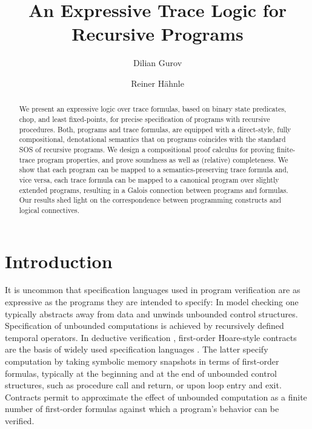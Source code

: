 \documentclass[a4paper,numberwithinsect]{lipics-v2021}
\title{An Expressive Trace Logic for Recursive Programs}
\author{Dilian Gurov}{KTH Royal Institute of Technology, Stockholm, Sweden}{dilian@kth.se}{0000-0002-0074-8786}{}
\author{Reiner H\"{a}hnle}{Technical University of Darmstadt, Germany}{haehnle@cs.tu-darmstadt.de}{0000-0001-8000-7613}{}
\begin{document}
\maketitle

\begin{abstract}
  We present an expressive logic over trace formulas, based on binary
  state predicates, chop, and least fixed-points, for precise specification 
  of programs with recursive procedures. Both, programs and trace
  formulas, are equipped with a direct-style, fully compositional,
  denotational semantics that on programs coincides with the standard
  SOS of recursive programs.
  We design a compositional proof calculus for proving finite-trace
  program properties, and prove soundness as well as (relative) completeness.
  We show that each program can be mapped to a semantics-preserving
  trace formula and, vice versa, each trace formula can be mapped to a
  canonical program over slightly extended programs, resulting in a
  Galois connection between programs and formulas.
  Our results shed light on the correspondence between programming
  constructs and logical connectives. 
\end{abstract}


\section{Introduction}
\label{sec:intro}

It is uncommon that specification languages used in program
verification are as expressive as the programs they are intended to
specify:
%
In model checking \cite{CGP99} one typically abstracts away from data
and unwinds unbounded control structures. Specification of unbounded
computations is achieved by recursively defined temporal operators.
%
In deductive verification \cite{HaehnleHuisman19}, first-order
Hoare-style contracts \cite{Hoare71} are the basis of widely used
specification languages \cite{acsl,JML-Ref-Manual}. The latter
specify computation by taking symbolic memory snapshots in terms of
first-order formulas, typically at the beginning and at the end of
unbounded control structures, such as procedure call and return, or
upon loop entry and exit. Contracts permit to approximate the effect
of unbounded computation as a finite number of first-order formulas
against which a program's behavior can be verified.
\end{document}
